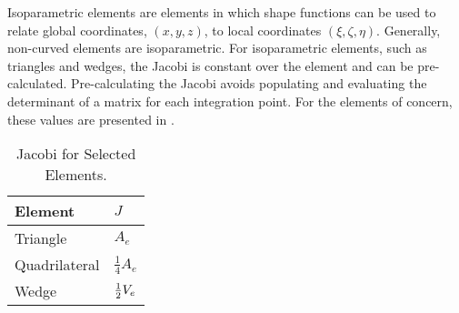     Isoparametric elements are elements in which shape functions can be used to
    relate global coordinates, $(x,y,z)$, to local coordinates
    $(\xi,\zeta,\eta)$. Generally, non-curved elements are isoparametric. For
    isoparametric elements, such as triangles and wedges, the Jacobi is constant
    over the element and can be pre-calculated. Pre-calculating the Jacobi
    avoids populating and evaluating the determinant of a matrix for each
    integration point. For the elements of concern, these values are presented
    in  \cite{textbookcolorado}.

    \begin{table}
      \caption{Jacobi for Selected Elements.}
      \label{tab:jacobi}
      \begin{center}
        \begin{tabular}{ll}
          \toprule
          Element & $J$ \\
          \midrule
          Triangle      & $A_e$ \\
          Quadrilateral & $\frac{1}{4} A_e$ \\
          Wedge         & $\frac{1}{2} V_e$ \\
          \bottomrule
        \end{tabular}
      \end{center}
    \end{table}

